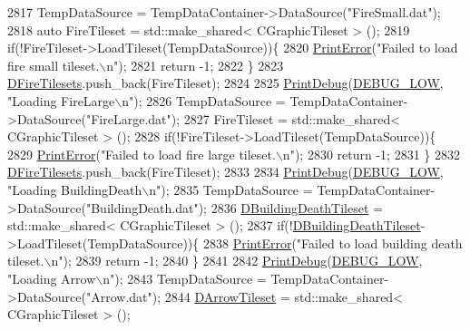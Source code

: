 \begin{DoxyCode}
2817     TempDataSource = TempDataContainer->DataSource(\textcolor{stringliteral}{"FireSmall.dat"});
2818     \textcolor{keyword}{auto} FireTileset = std::make\_shared< CGraphicTileset > ();
2819     \textcolor{keywordflow}{if}(!FireTileset->LoadTileset(TempDataSource))\{
2820         \hyperlink{Debug_8h_a2ed825eefefe35baf59a93a8c641323d}{PrintError}(\textcolor{stringliteral}{"Failed to load fire small tileset.\(\backslash\)n"});
2821         \textcolor{keywordflow}{return} -1;
2822     \}
2823     \hyperlink{classCApplicationData_a68f7be36ab8b46ea7fca3bd3e79784cd}{DFireTilesets}.push\_back(FireTileset);
2824     
2825     \hyperlink{Debug_8h_aa5f00f5537c9760f6ae1782460748ab9}{PrintDebug}(\hyperlink{Debug_8h_a3a5f3fc09784650d8388cb854882f840}{DEBUG\_LOW}, \textcolor{stringliteral}{"Loading FireLarge\(\backslash\)n"});
2826     TempDataSource = TempDataContainer->DataSource(\textcolor{stringliteral}{"FireLarge.dat"});
2827     FireTileset = std::make\_shared< CGraphicTileset > ();
2828     \textcolor{keywordflow}{if}(!FireTileset->LoadTileset(TempDataSource))\{
2829         \hyperlink{Debug_8h_a2ed825eefefe35baf59a93a8c641323d}{PrintError}(\textcolor{stringliteral}{"Failed to load fire large tileset.\(\backslash\)n"});
2830         \textcolor{keywordflow}{return} -1;
2831     \}
2832     \hyperlink{classCApplicationData_a68f7be36ab8b46ea7fca3bd3e79784cd}{DFireTilesets}.push\_back(FireTileset);
2833     
2834     \hyperlink{Debug_8h_aa5f00f5537c9760f6ae1782460748ab9}{PrintDebug}(\hyperlink{Debug_8h_a3a5f3fc09784650d8388cb854882f840}{DEBUG\_LOW}, \textcolor{stringliteral}{"Loading BuildingDeath\(\backslash\)n"});
2835     TempDataSource = TempDataContainer->DataSource(\textcolor{stringliteral}{"BuildingDeath.dat"});
2836     \hyperlink{classCApplicationData_ab463f816076fec8d43ecfe61120e8e6b}{DBuildingDeathTileset} = std::make\_shared< CGraphicTileset > ();
2837     \textcolor{keywordflow}{if}(!\hyperlink{classCApplicationData_ab463f816076fec8d43ecfe61120e8e6b}{DBuildingDeathTileset}->LoadTileset(TempDataSource))\{
2838         \hyperlink{Debug_8h_a2ed825eefefe35baf59a93a8c641323d}{PrintError}(\textcolor{stringliteral}{"Failed to load building death tileset.\(\backslash\)n"});
2839         \textcolor{keywordflow}{return} -1;
2840     \}
2841     
2842     \hyperlink{Debug_8h_aa5f00f5537c9760f6ae1782460748ab9}{PrintDebug}(\hyperlink{Debug_8h_a3a5f3fc09784650d8388cb854882f840}{DEBUG\_LOW}, \textcolor{stringliteral}{"Loading Arrow\(\backslash\)n"});
2843     TempDataSource = TempDataContainer->DataSource(\textcolor{stringliteral}{"Arrow.dat"});
2844     \hyperlink{classCApplicationData_a5c617fcea02a399ecffee313eead2159}{DArrowTileset} = std::make\_shared< CGraphicTileset > ();

\end{DoxyCode}
